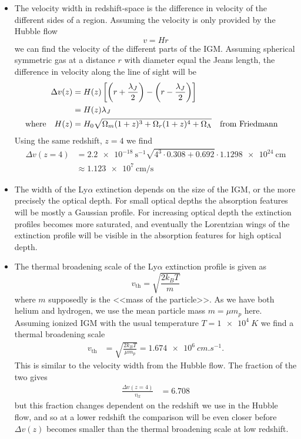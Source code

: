 \documentclass[11pt,a4paper]{article}
\begin{document}
\begin{itemize}
\item The velocity width in redshift-space is the difference in velocity of the different sides of a region. Assuming the velocity is only provided by the Hubble flow
\begin{equation}
v = Hr
\label{eq:Hubble_flow}
\end{equation}
we can find the velocity of the different parts of the IGM. Assuming spherical symmetric gas at a distance $r$ with diameter equal the Jeans length, the difference in velocity along the line of sight will be
\begin{align}
\Delta v(z) &= H(z) \left[\left(r+\frac{\lambda_J}{2}\right) - \left(r - \frac{\lambda_J}{2}\right)\right]
\\
&= H(z) \lambda_J
\\
\qq*{where} H(z) &= H_0 \sqrt{\Omega_m(1+z)^3+\Omega_r(1+z)^4+\Omega_\Lambda} \qq{from Friedmann} \label{eq:Friedmann}
\end{align}
Using the same redshift, $z=4$ we find
\begin{align*}
\Delta v(z=4) &= \SI{2.2e-18}{\s^{-1}} \sqrt{4^3\cdot0.308+0.692}\cdot \SI{1.1298e24}{\cm}
\\
&\approx \SI{1.123e7}{\cm\per\s}
\end{align*}

\item 
The width of the Ly$\alpha$ extinction depends on the size of the IGM, or the more precisely the optical depth. For small optical depths the absorption features will be mostly a Gaussian profile. For increasing optical depth the extinction profiles becomes more saturated, and eventually the Lorentzian wings of the extinction profile will be visible in the absorption features for high optical depth.

\item The thermal broadening scale of the Ly$\alpha$ extinction profile is given as
\begin{equation*}
v_\text{th} = \sqrt{\frac{2k_B T}{m}}
\end{equation*}
where $m$ supposedly is the <<mass of the particle>>. As we have both helium and hydrogen, we use the mean particle mass $m= \mu m_p$ here. Assuming ionized IGM with the usual temperature $T=\SI{1e4}{K}$ we find a thermal broadening scale
\begin{align*}
v_\text{th} &= \sqrt{\frac{2k_B T}{\mu m_p}}  = \SI{1.674e6}{cm.s^{-1}}.
\end{align*}
This is similar to the velocity width from the Hubble flow. The fraction of the two gives
\begin{align*}
\frac{\Delta v(z=4)}{v_\text{tf}} &= 6.708
\end{align*}
but this fraction changes dependent on the redshift we use in the Hubble flow, and so at a lower redshift the comparison will be even closer before $\Delta v(z)$ becomes smaller than the thermal broadening scale at low redshift.
\end{itemize}
\end{document}
